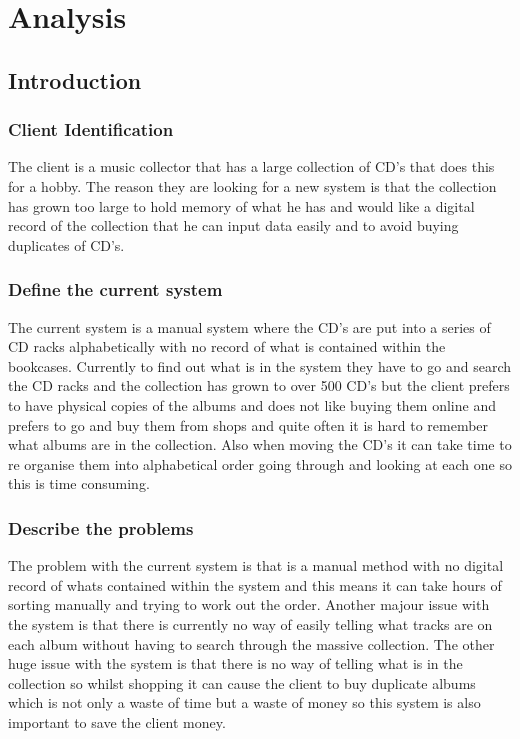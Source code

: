 \chapter{Analysis}

\section{Introduction}

\subsection{Client Identification}
The client is a music collector that has a large collection of CD’s that does this for a hobby. The reason they are looking for a new system is that the collection has grown too large to hold memory of what he has and would like a digital record of the collection that he can input data easily and to avoid buying duplicates of CD’s.
\subsection{Define the current system}

The current system is a manual system where the CD’s are put into a series of CD racks alphabetically with no record of what is contained within the bookcases. 
Currently to find out what is in the system they have to go and search the CD racks and the collection has grown to over 500 CD's but the client prefers to have physical copies of the albums and does not like buying them online and prefers to go and buy them from shops and quite often it is hard to remember what albums are in the collection. 
Also when moving the CD's it can take time to re organise them into alphabetical order going through and looking at each one so this is time consuming.

\subsection{Describe the problems}
The problem with the current system is that is a manual method with  no digital record of whats contained within the system and this means it can take hours of sorting manually and trying to work out the order.
Another majour issue with the system is that there is currently no way of easily telling what tracks are on each album without having to search through the massive collection.
The other huge issue with the system is that there is no way of telling what is in the collection so whilst shopping it can cause the client to buy duplicate albums which is not only a waste of time but a waste of money so this system is also important to save the client money. 

